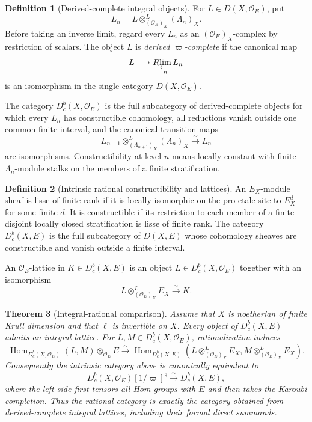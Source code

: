 \documentclass[10pt]{article}
\newtheorem{theorem}{Theorem}[section]
\theoremstyle{definition}
\newtheorem{definition}[theorem]{Definition}
\newcommand{\OO}{\mathcal O}
\newcommand{\Hom}{\operatorname{Hom}}
\begin{document}
\begin{definition}[Derived-complete integral objects]
For \(L\in D(X,\OO_E)\), put
\[
 L_n=L\otimes^L_{(\OO_E)_X}(\Lambda_n)_X.
\]
Before taking an inverse limit, regard every \(L_n\) as an
\((\OO_E)_X\)-complex by restriction of scalars.  The object \(L\) is
\emph{derived \(\varpi\)-complete} if the canonical map
\[
 L\longrightarrow R\!\varprojlim_n L_n
\]
is an isomorphism in the single category \(D(X,\OO_E)\).

The category \(D^b_c(X,\OO_E)\) is the full subcategory of derived-complete
objects for which every \(L_n\) has constructible cohomology, all reductions
vanish outside one common finite interval, and the canonical transition maps
\[
 L_{n+1}\otimes^L_{(\Lambda_{n+1})_X}(\Lambda_n)_X
          \xrightarrow{\sim}L_n
\]
are isomorphisms.  Constructibility at level \(n\) means locally constant
with finite \(\Lambda_n\)-module stalks on the members of a finite
stratification.
\end{definition}

\begin{definition}[Intrinsic rational constructibility and lattices]
An \(E_X\)-module sheaf is lisse of finite rank if it is locally isomorphic
on the pro-etale site to \(E_X^d\) for some finite \(d\).  It is
constructible if its restriction to each member of a finite disjoint
locally closed stratification is lisse of finite rank.  The category
\(D^b_c(X,E)\) is the full
subcategory of \(D(X,E)\) whose cohomology sheaves are constructible and
vanish outside a finite interval.

An \(\OO_E\)-lattice in \(K\in D^b_c(X,E)\) is an object
\(L\in D^b_c(X,\OO_E)\) together with an isomorphism
\[
          L\otimes^L_{(\OO_E)_X}E_X\xrightarrow{\sim}K.
\]
\end{definition}

\begin{theorem}[Integral-rational comparison]
Assume that \(X\) is noetherian of finite Krull dimension and that
\(\ell\) is invertible on \(X\).  Every object of \(D^b_c(X,E)\) admits an
integral lattice.  For \(L,M\in D^b_c(X,\OO_E)\), rationalization induces
\[
 \Hom_{D^b_c(X,\OO_E)}(L,M)\otimes_{\OO_E}E
 \xrightarrow{\sim}
 \Hom_{D^b_c(X,E)}
   (L\otimes^L_{(\OO_E)_X}E_X,
    M\otimes^L_{(\OO_E)_X}E_X).
\]
Consequently the intrinsic category above is canonically equivalent to
\[
 D^b_c(X,\OO_E)[1/\varpi]^\natural
       \xrightarrow{\sim}D^b_c(X,E),
\]
where the left side first tensors all Hom groups with \(E\) and then takes
the Karoubi completion.  Thus the rational category is exactly the category
obtained from derived-complete integral lattices, including their formal
direct summands.
\end{theorem}
\end{document}
